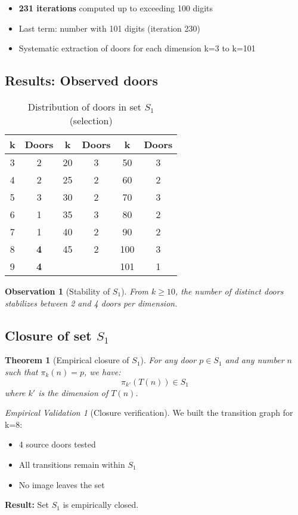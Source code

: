 \documentclass[12pt,a4paper]{article}
\newtheorem{theorem}{Theorem}[section]
\newtheorem{observation}{Observation}[section]
\theoremstyle{remark}
\newtheorem{validation}{Empirical Validation}[section]
\begin{document}
\begin{itemize}
\item \textbf{231 iterations} computed up to exceeding 100 digits
\item Last term: number with 101 digits (iteration 230)
\item Systematic extraction of doors for each dimension k=3 to k=101
\end{itemize}

\subsection{Results: Observed doors}

\begin{table}[h]
\centering
\caption{Distribution of doors in set $S_1$ (selection)}
\label{tab:distribution_S1}
\begin{tabular}{cc|cc|cc}
\toprule
\textbf{k} & \textbf{Doors} & \textbf{k} & \textbf{Doors} & \textbf{k} & \textbf{Doors}\\
\midrule
3 & 2 & 20 & 3 & 50 & 3\\
4 & 2 & 25 & 2 & 60 & 2\\
5 & 3 & 30 & 2 & 70 & 3\\
6 & 1 & 35 & 3 & 80 & 2\\
7 & 1 & 40 & 2 & 90 & 2\\
8 & \textbf{4} & 45 & 2 & 100 & 3\\
9 & \textbf{4} & & & 101 & 1\\
\bottomrule
\end{tabular}
\end{table}

\begin{observation}[Stability of $S_1$]
From $k\geq 10$, the number of distinct doors stabilizes between 2 and 4 doors per dimension.
\end{observation}

\subsection{Closure of set $S_1$}

\begin{theorem}[Empirical closure of $S_1$]
For any door $p \in S_1$ and any number $n$ such that $\pi_k(n) = p$, we have:
\[
\pi_{k'}(T(n)) \in S_1
\]
where $k'$ is the dimension of $T(n)$.
\end{theorem}

\begin{validation}[Closure verification]
We built the transition graph for k=8:
\begin{itemize}
\item 4 source doors tested
\item All transitions remain within $S_1$
\item No image leaves the set
\end{itemize}

\textbf{Result:} Set $S_1$ is empirically closed.
\end{validation}
\end{document}
